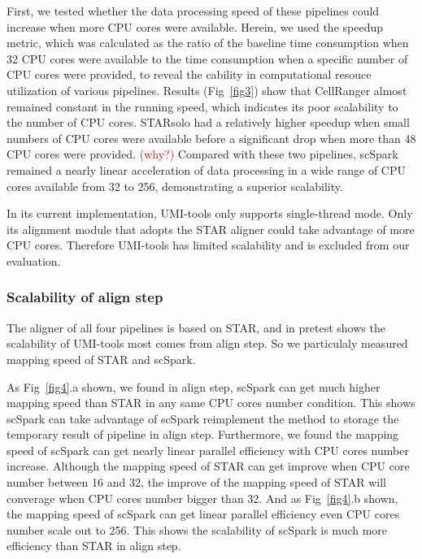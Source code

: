 \documentclass[conference]{IEEEtran}
\begin{document}
First, we tested whether the data processing speed of these pipelines could increase when more CPU cores were available. Herein, we used the speedup metric, which was calculated as the ratio of the baseline time consumption when 32 CPU cores were available to the time consumption when a specific number of CPU cores were provided, to reveal the cability in computational resouce utilization of various pipelines. Results (Fig~\ref{fig3}) show that CellRanger almost remained constant in the running speed, which indicates its poor scalability to the number of CPU cores. STARsolo had a relatively higher speedup when small numbers of CPU cores were available before a significant drop when more than 48 CPU cores were provided. \textcolor{red}{(why?)}
Compared with these two pipelines, scSpark remained a nearly linear acceleration of data processing in a wide range of CPU cores available from 32 to 256, demonstrating a superior scalability. 

In its current implementation, UMI-tools only supports single-thread mode. Only its alignment module that adopts the STAR aligner could take advantage of more CPU cores. 
Therefore UMI-tools has limited scalability and is excluded from our evaluation. 

\subsubsection{Scalability of align step}
The aligner of all four pipelines is based on STAR, and in pretest shows the scalability of UMI-tools most comes from align step.
So we particulaly measured mapping speed of STAR and scSpark.

As Fig~\ref{fig4}.a shown, we found in align step, scSpark can get much higher mapping speed than STAR in any same CPU cores number condition.
This shows scSpark can take advantage of scSpark reimplement the method to storage the temporary result of pipeline in align step.
Furthermore, we found the mapping speed of scSpark can get nearly linear parallel efficiency with CPU cores number increase.
Although the mapping speed of STAR can get improve when CPU core number between 16 and 32, the improve of the mapping speed of STAR will converage when CPU cores number bigger than 32.
And as Fig~\ref{fig4}.b shown, the mapping speed of scSpark can get linear parallel efficiency even CPU cores number scale out to 256.
This shows the scalability of scSpark is much more efficiency than STAR in align step.
\end{document}
